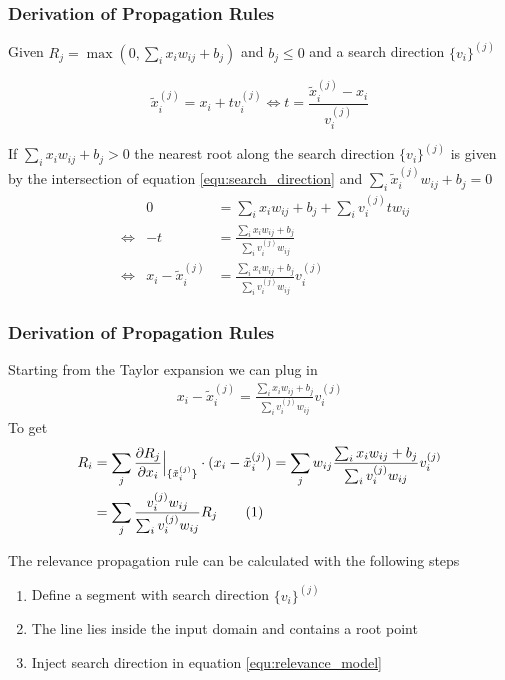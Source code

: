 \documentclass{beamer}
\newcommand\numberthis{\addtocounter{equation}{1}\tag{\theequation}}
\begin{document}
\begin{frame}
\frametitle{Derivation of Propagation Rules}
\vspace{0.5cm}
Given $R_j = \max(0, \sum_i x_i w_{ij} + b_j)$ and $b_j \leq 0$ and a search direction $\{v_i\}^{(j)}$

\begin{equation}
\tilde{x}^{(j)}_i = x_i + t v_i ^{(j)} \Leftrightarrow t = \frac{\tilde{x}_i^{(j)} - x_i}{v_i^{(j)}}
\label{equ:search_direction}
\end{equation}

\pause
\vspace{0.1cm}
If $\sum_i x_i w_{ij} + b_j>0$ the nearest root along the search direction $\{v_i\}^{(j)}$ is given by the intersection of equation \eqref{equ:search_direction} and $\sum_i\tilde{x}_i^{(j)} w_{ij} + b_j=0$  
\begin{align*}
&               & 			0 &= \sum_i x_i w_{ij} + b_j + \sum_i v_i^{(j)} t w_{ij} \\[0.25em]
&\Leftrightarrow& -t & = \frac{\sum_i x_i w_{ij} + b_j}{\sum_i v_i^{(j)} w_{ij}}\\[0.5em]
&\Leftrightarrow& x_i - \tilde{x}_i^{(j)} & = \frac{\sum_i x_i w_{ij} + b_j}{\sum_i v_i^{(j)} w_{ij}} v_i^{(j)}
\end{align*}

\end{frame}




\begin{frame}
\frametitle{Derivation of Propagation Rules}
\vspace{0.4cm}
Starting from the Taylor expansion we can plug in 
\begin{align*}
x_i - \tilde{x}_i^{(j)} = \frac{\sum_i x_i w_{ij} + b_j}{\sum_i v_i^{(j)} w_{ij}} v_i^{(j)}
\end{align*}
\vspace{-0.2cm}
To get
\vspace{-0.2cm}
\begin{align*}
R_i & = \sum_j \frac{\partial R_j}{\partial x_i}\Big|_{\{\tilde{x}_i^{(j)}\}} \cdot (x_i - \tilde{x}_i^{(j)})= \sum_j w_{ij}\frac{\sum_i x_i w_{ij} + b_j}{\sum_i v_i^{(j)} w_{ij}} v_i^{(j)}\\
&= \sum_j\frac{v_i^{(j)} w_{ij}}{\sum_i v_i^{(j)} w_{ij}} R_j \numberthis \label{equ:relevance_model}
\end{align*}

\pause
The relevance propagation rule can be calculated with the following steps
\begin{enumerate}
	\item Define a segment with search direction $\{v_i\}^{(j)}$
	\item The line lies inside the input domain and contains a root point
	\item Inject search direction in equation \eqref{equ:relevance_model}
\end{enumerate}
\end{frame}
\end{document}
